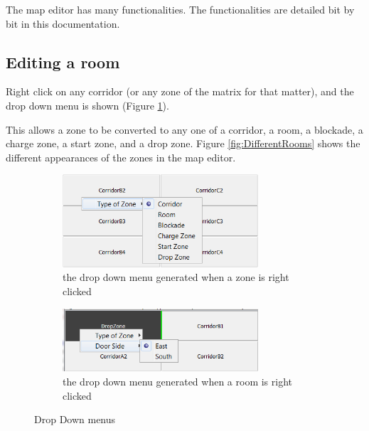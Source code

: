 The map editor has many functionalities. The functionalities are detailed bit by bit in this documentation.


\subsection{Editing a room}

Right click on any corridor (or any zone of the matrix for that matter), and the drop down menu is shown (Figure \ref{fig:DropDownMenuRoom}).

This allows a zone to be converted to any one of a corridor, a room, a blockade, a charge zone, a start zone, and a drop zone. Figure \ref{fig:DifferentRooms} shows the different appearances of the zones in the map editor.

 \begin{figure}
        \centering
        \begin{subfigure}[b]{0.48\textwidth} %
        	\includegraphics[width=0.8\textwidth]{EnvironmentStore/DropDownMenuRoom.png}
	\caption{the drop down menu generated when a zone is right clicked}\label{fig:DropDownMenuRoom}
        \end{subfigure}
        \begin{subfigure}[b]{0.48\textwidth}
	\includegraphics[width=0.8\textwidth]{EnvironmentStore/DropDownMenuRoom2.png}
	\caption{the drop down menu generated when a room is right clicked}\label{DropDownMenuRoom2}
        \end{subfigure}
        \caption{Drop Down menus}\label{fig:animals}
\end{figure}

